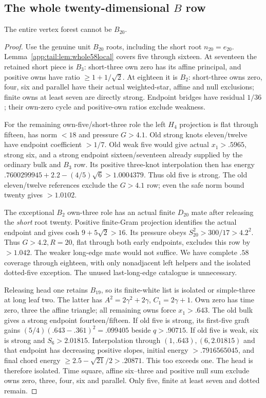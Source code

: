 \subsection{The whole twenty-dimensional $B$ row}
\begin{lemma}\label{app:tail:lem:wholeB20}
The entire vertex forest cannot be $B_{20}$.
\end{lemma}
\begin{proof}
Use the genuine unit $B_{20}$ roots, including the short root
$n_{20}=e_{20}$. Lemma~\ref{app:tail:lem:whole58local} covers
five through sixteen. At seventeen the retained short piece is
$B_3$: short-three own zero has its affine principal, and positive
owns have ratio $\ge1+1/\sqrt2$. At eighteen it is $B_2$:
short-three owns zero, four, six and parallel have their actual
weighted-star, affine and null exclusions; finite owns at least
seven are directly strong. Endpoint bridges have residual $1/36$;
their own-zero cycle and positive-own ratios exclude weakness.

For the remaining own-five/short-three role the left $H_4$
projection is flat through fifteen, has norm $<18$ and pressure
$G>4.1$. Old strong knots eleven/twelve have endpoint coefficient
$>1/7$. Old weak five would give actual $x_1>.5965$, strong six,
and a strong endpoint sixteen/seventeen already supplied by the
ordinary bulk and $B_3$ row. Its positive three-knot interpolation
then has energy
$.7600299945+2.2-(4/5)\sqrt6>1.0004379$.
Thus old five is strong. The old eleven/twelve references exclude
the $G>4.1$ row; even the safe norm bound twenty gives $>1.0102$.

The exceptional $B_2$ own-three role has an actual finite $D_{20}$
mate after releasing the \emph{short} root twenty. Positive
finite-Gram projection identifies the actual endpoint and gives
cosh $9+5\sqrt2>16$. Its pressure obeys
$S_{20}^2>300/17>4.2^2$. Thus $G>4.2,R=20$, flat through
both early endpoints, excludes this row by $>1.042$.
The weaker long-edge mate would not suffice.
We have complete $.58$ coverage through eighteen, with only
nonadjacent left helpers and the isolated dotted-five exception.
The unused last-long-edge catalogue is unnecessary.

Releasing head one retains $B_{19}$, so its finite-white list is
isolated or simple-three at long leaf two. The latter has
$A^2=2\gamma^2+2\gamma$, $C_1=2\gamma+1$.
Own zero has time zero, three the affine triangle; all remaining
owns force $x_1>.643$.
The old bulk gives a strong endpoint fourteen/fifteen. If old
five is strong, its first-five graft gains
$(5/4)(.643-.361)^2=.099405$ beside $q>.90715$.
If old five is weak, six is strong and $S_6>2.01815$.
Interpolation through $(1,.643),(6,2.01815)$ and that endpoint
has decreasing positive slopes, initial energy $>.7916565045$,
and final chord energy $\ge2.5-\sqrt{21}/2>.20871$.
This too exceeds one. The head is therefore isolated.
Time square, affine six--three and positive null sum exclude
owns zero, three, four, six and parallel. Only five, finite
at least seven and dotted remain.


\end{proof}
